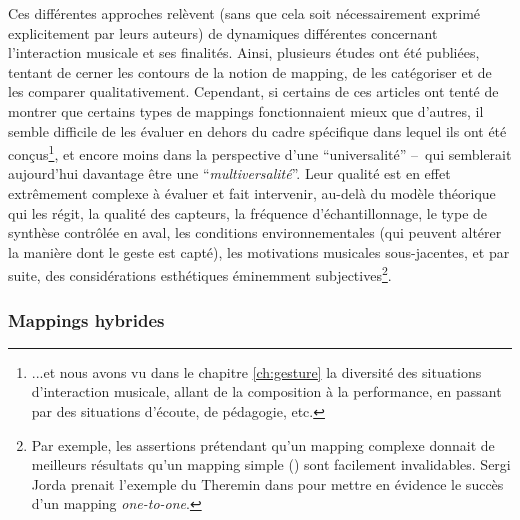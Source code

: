 \noindent Ces différentes approches relèvent (sans que cela soit nécessairement exprimé explicitement par leurs auteurs) de dynamiques différentes concernant l'interaction musicale et ses finalités. Ainsi, plusieurs études ont été publiées, tentant de cerner les contours de la notion de mapping, de les catégoriser et de les comparer qualitativement. Cependant, si certains de ces articles ont tenté de montrer que certains types de mappings fonctionnaient mieux que d'autres, il semble difficile de les évaluer en dehors du cadre spécifique dans lequel ils ont été conçus\footnote{...et nous avons vu dans le chapitre \ref{ch:gesture} la diversité des situations d'interaction musicale, allant de la composition à la performance, en passant par des situations d'écoute, de pédagogie, etc.}, et encore moins dans la perspective d'une ``universalité'' --~qui semblerait aujourd'hui davantage être une ``\textit{multiversalité}''. Leur qualité est en effet extrêmement complexe à évaluer et fait intervenir, au-delà du modèle théorique qui les régit, la qualité des capteurs, la fréquence d'échantillonnage, le type de synthèse contrôlée en aval, les conditions environnementales (qui peuvent altérer la manière dont le geste est capté), les motivations musicales sous-jacentes, et par suite, des considérations esthétiques éminemment subjectives\footnote{Par exemple, les assertions prétendant qu'un mapping complexe donnait de meilleurs résultats qu'un mapping simple (\cite{rovan_instrumental_1997, hunt_mapping_2000}) sont facilement invalidables. Sergi Jorda prenait l'exemple du Theremin dans \cite{jorda_digital_2005} pour mettre en évidence le succès d'un mapping \textit{one-to-one}.}.

\subsubsection{Mappings hybrides} 

